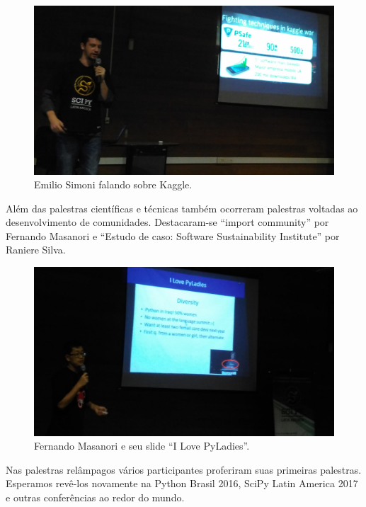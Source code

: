 \documentclass[12pt]{article}
\begin{document}
\begin{figure}[!htb]
\center
\includegraphics[height=.3\textheight]{talks-kaggle.jpg}
\caption{Emilio Simoni falando sobre Kaggle.}
\end{figure}

Além das palestras científicas e técnicas também ocorreram palestras voltadas
ao desenvolvimento de comunidades. Destacaram-se ``import community'' por
Fernando Masanori e ``Estudo de caso: Software Sustainability Institute'' por
Raniere Silva.

\begin{figure}[!htb]
\center
\includegraphics[height=.3\textheight]{talks-pyladies.jpg}
\caption{Fernando Masanori e seu slide ``I Love PyLadies''.}
\end{figure}

Nas palestras relâmpagos vários participantes proferiram suas primeiras
palestras. Esperamos revê-los novamente na Python Brasil 2016, SciPy Latin
America 2017 e outras conferências ao redor do mundo.
\end{document}
